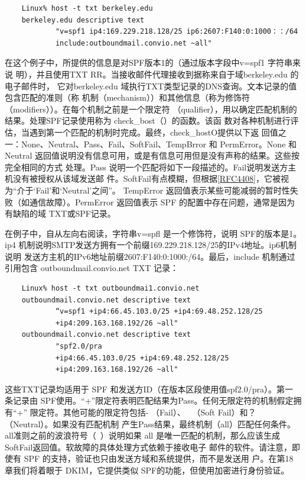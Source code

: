 \begin{verbatim}
    Linux% host -t txt berkeley.edu
    berkeley.edu descriptive text
            "v=spf1 ip4:169.229.218.128/25 ip6:2607:F140:0:1000：：/64
            include:outboundmail.convio.net ~all"
\end{verbatim}

在这个例子中，所提供的信息是对SPF版本1的（通过版本字段中v=spf1 字符串来说
明），并且使用TXT RR。当接收邮件代理接收到据称来自于域berkeley.edu 的电子邮件时，
它对berkeley.edu 域执行TXT类型记录的DNS查询。文本记录的值包含匹配的准则（称
机制（mechanism））和其他信息（称为修饰符（modifiers））。在每个机制之前是一个限定符
（qualifier），用以确定匹配机制的结果。处理SPF记录使用称为 check\_bost（）的函数。该函
数对各种机制进行评估，当遇到第一个匹配的机制时完成。最终，check\_hostO提供以下返
回值之一：None、Neutral、Pass、Fail、SoftFail、TempBrror 和 PermError。None 和 Neutral
返回值说明没有信息可用，或是有信息可用但是没有声称的结果。这些按完全相同的方式
处理。Pass 说明一个匹配将如下一段描述的。Fail说明发送方主机没有被授权从该域发送邮
件。SoftFail有点模糊，但根据\href{https://www.rfc-editor.org/rfc/rfc4408}{[RFC4408]}，它被视为“介于‘Fail’和‘Neutral’之间”。
TempError 返回值表示某些可能减弱的暂时性失败（如通信故障）。PermError 返回值表示
SPF 的配置中存在问题，通常是因为有缺陷的域 TXT或SPF记录。

在例子中，自从左向右阅读，字符串v=spfl 是一个修饰符，说明 SPF的版本是1。ip4
机制说明SMTP发送方拥有一个前缀169.229.218.128/25的IPv4地址。ip6机制说明
发送方主机的IPv6地址前缀2607:F140:0:1000:/64。最后，include 机制通过引用包含
outboundmail.convio.net TXT 记录：

\begin{verbatim}
    Linux% host -t txt outboundmai1.convio.net
    outboundmail.convio.net descriptive text
            “v=spf1 +ip4:66.45.103.0/25 +ip4:69.48.252.128/25
            +ip4:209.163.168.192/26 ~all"
    outboundmail.convio.net descriptive text
            "spf2.0/pra
            +ip4:66.45.103.0/25 +ip4:69.48.252.128/25
            +ip4:209.163.168.192/26 ~all"
\end{verbatim}

\begin{tcolorbox}
    这些TXT记录均适用于 SPF 和发送方ID（在版本区段使用值spf2.0/pra）。第一
    条记录由 SPF使用。“+”限定符表明匹配结果为Pass。任何无限定符的机制假定拥有“+”
    限定符。其他可能的限定符包括- （Fail）、~ （Soft Fail）和？（Neutral）。如果没有匹配机制
    产生Pass结果，最终机制（all）匹配任何条件。all准则之前的波浪符号（~）说明如果 all
    是唯一匹配的机制，那么应该生成SoftFail返回值。软故障的具体处理方式依赖于接收电子
    邮件的软件。请注意，即使有 SPF 的支持，验证也只由发送方域和系统提供，而不是发送用
    户。在第18 章我们将着眼于 DKIM，它提供类似 SPF的功能，但使用加密进行身份验证。
\end{tcolorbox}

